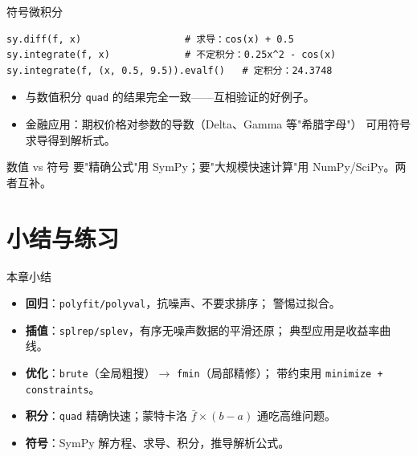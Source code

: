 \documentclass[9pt]{ctexbeamer}
\begin{document}
\begin{frame}[fragile]{符号微积分}
	\begin{lstlisting}
sy.diff(f, x)                  # 求导：cos(x) + 0.5
sy.integrate(f, x)             # 不定积分：0.25x^2 - cos(x)
sy.integrate(f, (x, 0.5, 9.5)).evalf()   # 定积分：24.3748
\end{lstlisting}
	\begin{itemize}
		\item 与数值积分 \texttt{quad} 的结果完全一致——互相验证的好例子。
		\item 金融应用：期权价格对参数的导数（Delta、Gamma 等"希腊字母"）
			可用符号求导得到解析式。
	\end{itemize}
	\begin{alertblock}{数值 vs 符号}
		要"精确公式"用 SymPy；要"大规模快速计算"用 NumPy/SciPy。两者互补。
	\end{alertblock}
\end{frame}


\section{小结与练习}

\begin{frame}{本章小结}
	\begin{itemize}
		\item \textbf{回归}：\texttt{polyfit/polyval}，抗噪声、不要求排序；
			警惕过拟合。
		\item \textbf{插值}：\texttt{splrep/splev}，有序无噪声数据的平滑还原；
			典型应用是收益率曲线。
		\item \textbf{优化}：\texttt{brute}（全局粗搜）$\to$ \texttt{fmin}（局部精修）；
			带约束用 \texttt{minimize + constraints}。
		\item \textbf{积分}：\texttt{quad} 精确快速；蒙特卡洛
			$\bar{f}\times(b-a)$ 通吃高维问题。
		\item \textbf{符号}：SymPy 解方程、求导、积分，推导解析公式。
	\end{itemize}
\end{frame}
\end{document}
